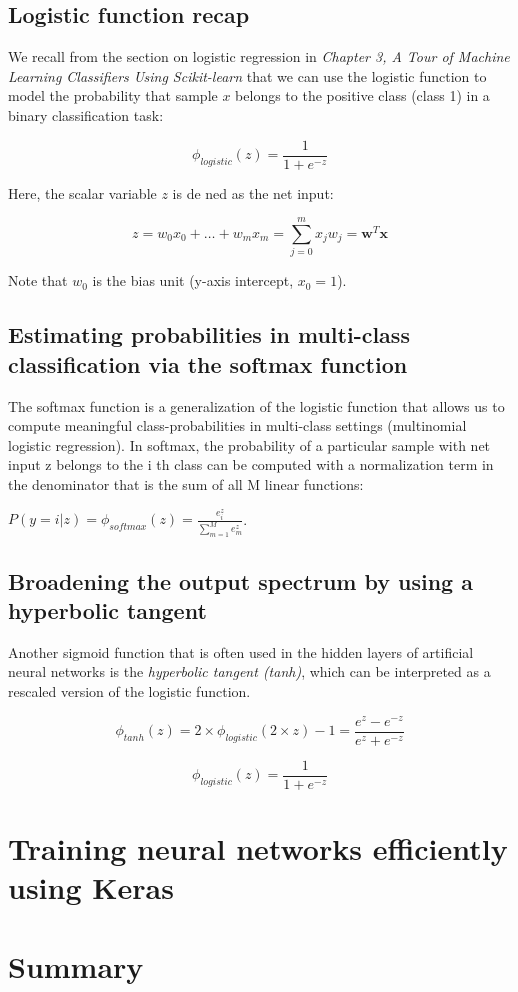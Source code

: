 \documentclass[letterpaper]{report}
\begin{document}
\subsection{Logistic function recap}

We recall from the section on logistic regression in \textit{Chapter 3, A Tour of Machine Learning Classifiers Using Scikit-learn} that we can use the logistic function to model the probability that sample $x$ belongs to the positive class (class 1) in a binary classification task:

\[ 
\phi_{logistic} (z) = \frac{1}{1 + e^{-z}}
\]

Here, the scalar variable $z$ is de ned as the net input:

\[
z = w_0 x_0 + \dots + w_m x_m = \sum_{j=0}^{m} x_j w_j = \mathbf{w}^T \mathbf{x}
\]

Note that $w_0$ is the bias unit (y-axis intercept, $x_0 =1$).

\subsection{Estimating probabilities in multi-class classification via the softmax function}

The softmax function is a generalization of the logistic function that allows us
to compute meaningful class-probabilities in multi-class settings (multinomial logistic regression). In softmax, the probability of a particular sample with net input z belongs to the i th class can be computed with a normalization term in the denominator that is the sum of all M linear functions:

$P(y=i | z) = \phi_{softmax}(z) = \frac{e_{i}^{z}}{\sum_{m=1}^{M} e_{m}^{z}}$.

\subsection{Broadening the output spectrum by using a hyperbolic tangent}

Another sigmoid function that is often used in the hidden layers of artificial neural networks is the \textit{hyperbolic tangent (tanh)}, which can be interpreted as a rescaled version of the logistic function.

\[
\phi_{tanh} (z) = 2 \times \phi_{logistic} (2 \times z) - 1 = \frac{e^{z} - e^{-z} }{e^{z} + e^{-z}}
\]

\[
\phi_{logistic}(z) = \frac{1}{1 + e^{-z}}
\]

\section{Training neural networks efficiently using Keras}
\section{Summary}
\end{document}
